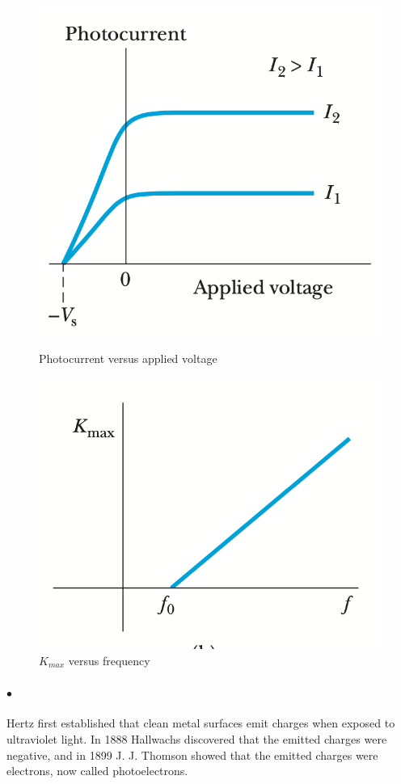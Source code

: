     \begin{figure}
        \includegraphics[width=0.9\linewidth]{figures/photocurrent versus applied voltage.png}
        \caption{Photocurrent versus applied voltage}
        \label{fig:Photocurrent versus applied voltage}
        \includegraphics[width=0.9\linewidth]{figures/Kmax.png}
        \caption{$K_{max}$ versus frequency}
        \label{fig:Kmax versus frequency}
    \end{figure}

    \paragraph{$\bullet$} Hertz first established that clean metal surfaces emit charges when exposed to 
    ultraviolet light. In 1888 Hallwachs discovered that the emitted charges were negative, 
    and in 1899 J. J. Thomson showed that the emitted charges were electrons, now called photoelectrons.

